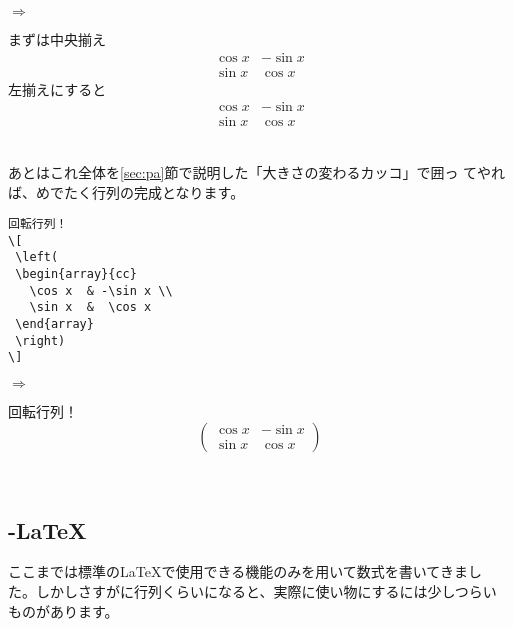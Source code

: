 $\Rightarrow$
\begin{minipage}{.45\textwidth}
\begin{shadebox}
まずは中央揃え
\[
 \begin{array}{cc}
   \cos x  & -\sin x \\
   \sin x  &  \cos x
 \end{array}
\]
左揃えにすると
\[
 \begin{array}{ll}
   \cos x  & -\sin x \\
   \sin x  &  \cos x
 \end{array}
\]
\end{shadebox}
\end{minipage}
\vspace*{1mm}\\
あとはこれ全体を\ref{sec:pa}節で説明した「大きさの変わるカッコ」で囲っ
てやれば、めでたく行列の完成となります。\\
\begin{minipage}[c]{.50\textwidth}
\begin{screen}
\small
\begin{verbatim}
回転行列！
\[
 \left(
 \begin{array}{cc}
   \cos x  & -\sin x \\
   \sin x  &  \cos x
 \end{array}
 \right)
\]
\end{verbatim}
\end{screen}
\end{minipage}%
$\Rightarrow$
\begin{minipage}{.45\textwidth}
\begin{shadebox}
回転行列！
\[
 \left(
 \begin{array}{cc}
   \cos x  & -\sin x \\
   \sin x  &  \cos x
 \end{array}
 \right)
\]
\end{shadebox}
\end{minipage}
\vspace*{1mm}\\

\subsection{\AmS-\LaTeX}
ここまでは標準の{\LaTeX}で使用できる機能のみを用いて数式を書いてきまし
た。しかしさすがに行列くらいになると、実際に使い物にするには少しつらい
ものがあります。

